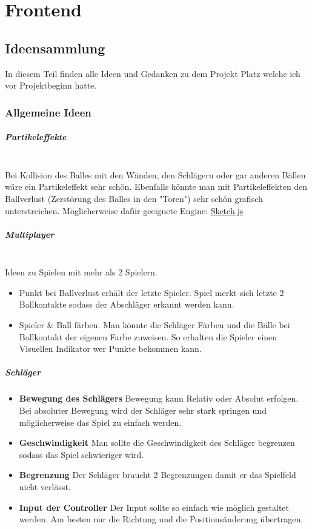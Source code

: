 \chapter{Frontend}
\section{Ideensammlung}
In diesem Teil finden alle Ideen und Gedanken zu dem Projekt Platz welche ich vor Projektbeginn hatte.
\subsection{Allgemeine Ideen}
\paragraph{Partikeleffekte}
\mbox{}\\
Bei Kollision des Balles mit den Wänden, den Schlägern oder gar anderen Bällen wäre ein Partikeleffekt sehr schön.
\newline
Ebenfalls könnte man mit Partikeleffekten den Ballverlust (Zerstörung des Balles in den "Toren") sehr schön grafisch unterstreichen.
\newline
Möglicherweise dafür geeignete Engine:
\href{http://soulwire.github.io/sketch.js/}{Sketch.js}
\paragraph{Multiplayer}
\mbox{}\\
Ideen zu Spielen mit mehr als 2 Spielern.
\begin{itemize}
	\item Punkt bei Ballverlust erhält der letzte Spieler. Spiel merkt sich letzte 2 Ballkontakte sodass der Abschläger erkannt werden kann.
	\item Spieler \& Ball färben. Man könnte die Schläger Färben und die Bälle bei Ballkontakt der eigenen Farbe zuweisen. So erhalten die Spieler einen Visuellen Indikator wer Punkte bekommen kann.
\end{itemize}
\newpage
\paragraph{Schläger}
\begin{itemize}
\item
\textbf{Bewegung des Schlägers} Bewegung kann Relativ oder Absolut erfolgen. Bei absoluter Bewegung wird der Schläger sehr stark springen und möglicherweise das Spiel zu einfach werden.
\item
\textbf{Geschwindigkeit} Man sollte die Geschwindigkeit des Schläger begrenzen sodass das Spiel  schwieriger wird.
\item
\textbf{Begrenzung} Der Schläger braucht 2 Begrenzungen damit er das Spielfeld nicht verlässt.
\item
\textbf{Input der Controller} Der Input sollte so einfach wie möglich gestaltet werden. Am besten nur die Richtung und die Positionsänderung übertragen.
\end{itemize}
